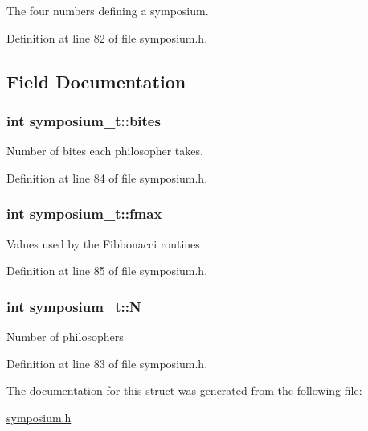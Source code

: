 The four numbers defining a symposium. 

Definition at line 82 of file symposium.\+h.



\subsection{Field Documentation}
\subsubsection[{\texorpdfstring{bites}{bites}}]{\setlength{\rightskip}{0pt plus 5cm}int symposium\+\_\+t\+::bites}\hypertarget{structsymposium__t_a9ee1b978200b8a4b7c30b170c1f20643}{}\label{structsymposium__t_a9ee1b978200b8a4b7c30b170c1f20643}
Number of bites each philosopher takes. 

Definition at line 84 of file symposium.\+h.

\subsubsection[{\texorpdfstring{fmax}{fmax}}]{\setlength{\rightskip}{0pt plus 5cm}int symposium\+\_\+t\+::fmax}\hypertarget{structsymposium__t_a038b49a350225fed31d5c148a9147ec6}{}\label{structsymposium__t_a038b49a350225fed31d5c148a9147ec6}
Values used by the Fibbonacci routines 

Definition at line 85 of file symposium.\+h.

\subsubsection[{\texorpdfstring{N}{N}}]{\setlength{\rightskip}{0pt plus 5cm}int symposium\+\_\+t\+::N}\hypertarget{structsymposium__t_a4e366c10036b2d89ebc2dbcdefba8999}{}\label{structsymposium__t_a4e366c10036b2d89ebc2dbcdefba8999}
Number of philosophers 

Definition at line 83 of file symposium.\+h.



The documentation for this struct was generated from the following file\+:\begin{DoxyCompactItemize}
\item 
\hyperlink{symposium_8h}{symposium.\+h}\end{DoxyCompactItemize}
